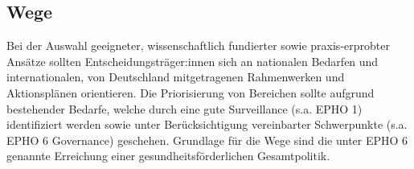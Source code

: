 \documentclass{article}
\begin{document}
\subsection{Wege}\label{H1636644}



Bei der Auswahl geeigneter, wissenschaftlich fundierter sowie praxis-erprobter Ansätze sollten Entscheidungsträger:innen sich an nationalen Bedarfen und internationalen, von Deutschland mitgetragenen Rahmenwerken und Aktionsplänen orientieren. Die Priorisierung von Bereichen sollte aufgrund bestehender Bedarfe, welche durch eine gute Surveillance (s.a. EPHO 1) identifiziert werden sowie unter Berücksichtigung vereinbarter Schwerpunkte (s.a. EPHO 6 Governance) geschehen. Grundlage für die Wege sind die unter EPHO 6 genannte Erreichung einer gesundheitsförderlichen Gesamtpolitik. 
\end{document}
